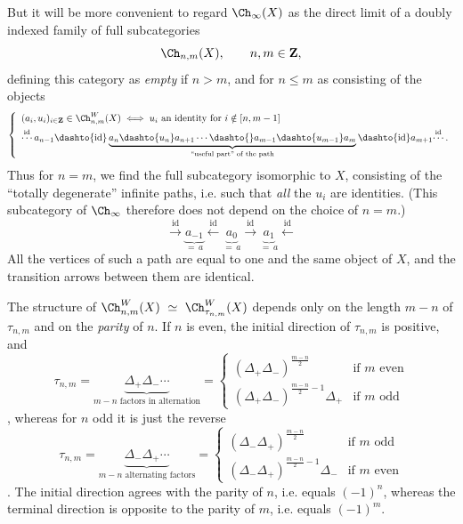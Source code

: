But it will be more convenient to regard $\Ch_{\infty}(X)$ as the direct limit of a
doubly indexed family of full subcategories
\[
\Ch_{n,m}(X), \qquad n, m \in \mathbf{Z},
\]
defining this category as \textit{empty} if $n > m$, and for $n \leq m$ as consisting of the objects
\[
\left\{ \begin{array}{l}
(a_i, u_i)_{i \in \mathbf{Z}} \in \Ch^{W}_{n,m}(X) \iff u_i \text{ an identity for } i \notin [n, m-1] \\[1ex]
\overset{\mathrm{id}}{\cdots}\, a_{n-1} \dashto{\mathrm{id}} \underbrace{a_n \dashto{u_n} a_{n+1} \cdots \dashto{} a_{m-1} \dashto{u_{m-1}} a_m}_{\text{\scriptsize ``useful part'' of the path}} \dashto{\mathrm{id}} a_{m+1} \overset{\mathrm{id}}{\cdots}\,.
\end{array} \right.
\]
Thus for $n = m$, we find the full subcategory isomorphic to $X$, consisting of the ``totally degenerate'' infinite paths, i.e. such that \textit{all} the $u_i$ are identities. (This subcategory of $\Ch_{\infty}$ therefore does not depend on the choice of $n = m$.)
\[
\xrightarrow{\mathrm{id}} \underbrace{a_{-1}}_{=\, a} \xleftarrow{\mathrm{id}} \underbrace{a_0}_{=\, a} \xrightarrow{\mathrm{id}} \underbrace{a_1}_{=\, a} \xleftarrow{\mathrm{id}}
\]
All the vertices of such a path are equal to one and the same object of $X$, and the transition arrows between them are identical.

The structure of $\Ch^{W}_{n,m}(X) \ \simeq \ \Ch^{W}_{\tau_{n,m}}(X)$ depends only on the length $m-n$ of $\tau_{n,m}$ and on the \textit{parity} of $n$. If $n$ is even, the initial direction of $\tau_{n,m}$ is positive, and
\[
\tau_{n,m} = \underbrace{\Delta_+ \Delta_- \cdots}_{m-n \text{ factors in alternation}} = \left\{ \begin{array}{ll}
(\Delta_+ \Delta_-)^{\frac{m-n}{2}} & \text{if } m \text{ even} \\[1ex]
(\Delta_+ \Delta_-)^{\frac{m-n}{2}-1} \Delta_+ & \text{if } m \text{ odd}
\end{array} \right.
\]
, whereas for $n$ odd it is just the reverse
\[
\tau_{n,m} = \underbrace{\Delta_- \Delta_+ \cdots}_{m-n \text{ alternating factors}} = \left\{ \begin{array}{ll}
(\Delta_- \Delta_+)^{\frac{m-n}{2}} & \text{if } m \text{ odd} \\[1ex]
(\Delta_- \Delta_+)^{\frac{m-n}{2}-1} \Delta_- & \text{if } m \text{ even}
\end{array} \right.
\]
. The initial direction agrees with the parity of $n$, i.e. equals $(-1)^n$, whereas the terminal direction is opposite to the parity of $m$, i.e. equals $(-1)^m$.

